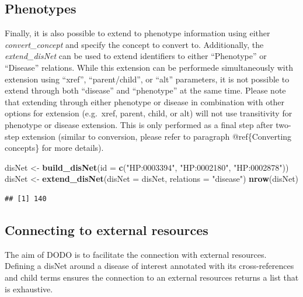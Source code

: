 \documentclass[9pt,a4paper,]{extarticle}
\newenvironment{Shaded}{\begin{snugshade}}{\end{snugshade}}
\newcommand{\DataTypeTok}[1]{\textcolor[rgb]{0.13,0.29,0.53}{#1}}
\newcommand{\KeywordTok}[1]{\textcolor[rgb]{0.13,0.29,0.53}{\textbf{#1}}}
\newcommand{\NormalTok}[1]{#1}
\newcommand{\StringTok}[1]{\textcolor[rgb]{0.31,0.60,0.02}{#1}}
\begin{document}
\hypertarget{phenotypes}{%
\subsection{Phenotypes}\label{phenotypes}}

Finally, it is also possible to extend to phenotype information using either \emph{convert\_concept} and specify the concept to convert to. Additionally, the \emph{extend\_disNet} can be used to extend identifiers to either ``Phenotype'' or ``Disease'' relations. While this extension can be performede simultaneously with extension using ``xref'', ``parent/child'', or ``alt'' parameters, it is not possible to extend through both ``disease'' and ``phenotype'' at the same time. Please note that extending through either phenotype or disease in combination with other options for extension (e.g.~xref, parent, child, or alt) will not use transitivity for phenotype or disease extension. This is only performed as a final step after two-step extension (similar to conversion, please refer to paragraph @ref\{Converting concepts\} for more details).

\begin{Shaded}
\begin{Highlighting}[]
\NormalTok{disNet <-}\StringTok{ }\KeywordTok{build_disNet}\NormalTok{(}\DataTypeTok{id =} \KeywordTok{c}\NormalTok{(}\StringTok{"HP:0003394"}\NormalTok{, }\StringTok{"HP:0002180"}\NormalTok{, }\StringTok{"HP:0002878"}\NormalTok{))}
\NormalTok{disNet <-}\StringTok{ }\KeywordTok{extend_disNet}\NormalTok{(}\DataTypeTok{disNet =}\NormalTok{ disNet, }\DataTypeTok{relations =} \StringTok{"disease"}\NormalTok{)}
\KeywordTok{nrow}\NormalTok{(disNet)}
\end{Highlighting}
\end{Shaded}

\begin{verbatim}
## [1] 140
\end{verbatim}

\hypertarget{connecting-to-external-resources}{%
\subsection{Connecting to external resources}\label{connecting-to-external-resources}}

The aim of DODO is to facilitate the connection with external resources. Defining a disNet around a disease of interest annotated with its cross-references and child terms ensures the connection to an external resources returns a list that is exhaustive.
\end{document}
